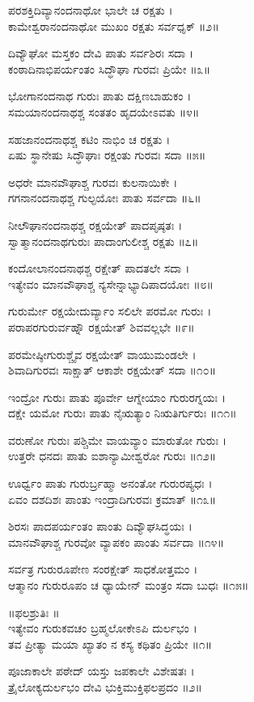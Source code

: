 ಪರಶಕ್ತಿದಿವ್ಯಾನಂದನಾಥೋ ಭಾಲೇ ಚ ರಕ್ಷತು ।\\
ಕಾಮೇಶ್ವರಾನಂದನಾಥೋ ಮುಖಂ ರಕ್ಷತು ಸರ್ವಧೃಕ್ ॥೨॥

ದಿವ್ಯೌಘೋ ಮಸ್ತಕಂ ದೇವಿ ಪಾತು ಸರ್ವಶಿರಃ ಸದಾ ।\\
ಕಂಠಾದಿನಾಭಿಪರ್ಯಂತಂ ಸಿದ್ಧೌಘಾ ಗುರವಃ ಪ್ರಿಯೇ ॥೩॥

ಭೋಗಾನಂದನಾಥ ಗುರುಃ ಪಾತು ದಕ್ಷಿಣಬಾಹುಕಂ ।\\
ಸಮಯಾನಂದನಾಥಶ್ಚ ಸಂತತಂ ಹೃದಯೇಽವತು ॥೪॥

ಸಹಜಾನಂದನಾಥಶ್ಚ ಕಟಿಂ ನಾಭಿಂ ಚ ರಕ್ಷತು ।\\
ಏಷು ಸ್ಥಾನೇಷು ಸಿದ್ಧೌಘಾಃ ರಕ್ಷಂತು ಗುರವಃ ಸದಾ ॥೫॥

ಅಧರೇ ಮಾನವೌಘಾಶ್ಚ ಗುರವಃ ಕುಲನಾಯಿಕೇ ।\\
ಗಗನಾನಂದನಾಥಶ್ಚ ಗುಲ್ಫಯೋಃ ಪಾತು ಸರ್ವದಾ ॥೬॥

ನೀಲೌಘಾನಂದನಾಥಶ್ಚ ರಕ್ಷಯೇತ್ ಪಾದಪೃಷ್ಠತಃ ।\\
ಸ್ವಾತ್ಮಾನಂದನಾಥಗುರುಃ ಪಾದಾಂಗುಲೀಶ್ಚ ರಕ್ಷತು ॥೭॥

ಕಂದೋಲಾನಂದನಾಥಶ್ಚ ರಕ್ಷೇತ್ ಪಾದತಲೇ ಸದಾ ।\\
ಇತ್ಯೇವಂ ಮಾನವೌಘಾಶ್ಚ ನ್ಯಸೇನ್ನಾಭ್ಯಾದಿಪಾದಯೋಃ ॥೮॥

ಗುರುರ್ಮೇ ರಕ್ಷಯೇದುರ್ವ್ಯಾಂ ಸಲಿಲೇ ಪರಮೋ ಗುರುಃ ।\\
ಪರಾಪರಗುರುರ್ವಹ್ನೌ ರಕ್ಷಯೇತ್ ಶಿವವಲ್ಲಭೇ ॥೯॥

ಪರಮೇಷ್ಠೀಗುರುಶ್ಚೈವ ರಕ್ಷಯೇತ್ ವಾಯುಮಂಡಲೇ ।\\
ಶಿವಾದಿಗುರವಃ ಸಾಕ್ಷಾತ್ ಆಕಾಶೇ ರಕ್ಷಯೇತ್ ಸದಾ ॥೧೦॥

ಇಂದ್ರೋ ಗುರುಃ ಪಾತು ಪೂರ್ವೇ ಆಗ್ನೇಯಾಂ ಗುರುರಗ್ನಯಃ ।\\
ದಕ್ಷೇ ಯಮೋ ಗುರುಃ ಪಾತು ನೈಋತ್ಯಾಂ ನಿಋತಿರ್ಗುರುಃ ॥೧೧॥

ವರುಣೋ ಗುರುಃ ಪಶ್ಚಿಮೇ ವಾಯವ್ಯಾಂ ಮಾರುತೋ ಗುರುಃ ।\\
ಉತ್ತರೇ ಧನದಃ ಪಾತು ಐಶಾನ್ಯಾಮೀಶ್ವರೋ ಗುರುಃ ॥೧೨॥

ಊರ್ಧ್ವಂ ಪಾತು ಗುರುರ್ಬ್ರಹ್ಮಾ ಅನಂತೋ ಗುರುರಪ್ಯಧಃ ।\\
ಏವಂ ದಶದಿಶಃ ಪಾಂತು ಇಂದ್ರಾದಿಗುರವಃ ಕ್ರಮಾತ್ ॥೧೩॥

ಶಿರಸಃ ಪಾದಪರ್ಯಂತಂ ಪಾಂತು ದಿವ್ಯೌಘಸಿದ್ಧಯಃ ।\\
ಮಾನವೌಘಾಶ್ಚ ಗುರವೋ ವ್ಯಾಪಕಂ ಪಾಂತು ಸರ್ವದಾ ॥೧೪॥

ಸರ್ವತ್ರ ಗುರುರೂಪೇಣ ಸಂರಕ್ಷೇತ್ ಸಾಧಕೋತ್ತಮಂ ।\\
ಆತ್ಮಾನಂ ಗುರುರೂಪಂ ಚ ಧ್ಯಾಯೇನ್ ಮಂತ್ರಂ ಸದಾ ಬುಧಃ ॥೧೫॥

॥ಫಲಶ್ರುತಿಃ ॥\\
ಇತ್ಯೇವಂ ಗುರುಕವಚಂ ಬ್ರಹ್ಮಲೋಕೇಽಪಿ ದುರ್ಲಭಂ ।\\
ತವ ಪ್ರೀತ್ಯಾ ಮಯಾ ಖ್ಯಾತಂ ನ ಕಸ್ಯ ಕಥಿತಂ ಪ್ರಿಯೇ ॥೧॥

ಪೂಜಾಕಾಲೇ ಪಠೇದ್ ಯಸ್ತು ಜಪಕಾಲೇ ವಿಶೇಷತಃ ।\\
ತ್ರೈಲೋಕ್ಯದುರ್ಲಭಂ ದೇವಿ ಭುಕ್ತಿಮುಕ್ತಿಫಲಪ್ರದಂ ॥೨॥


